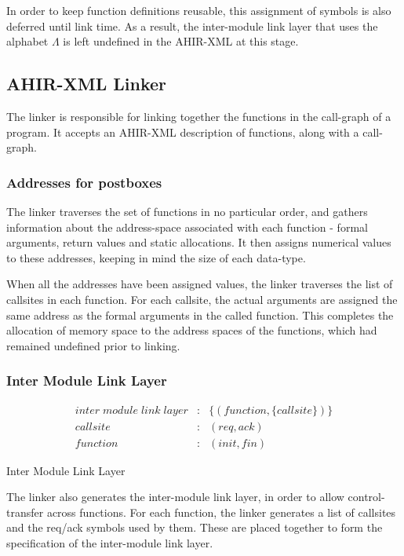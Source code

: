 \documentclass[12pt]{article}
\begin{document}
In order to keep function definitions reusable, this assignment of
symbols is also deferred until link time. As a result, the
inter-module link layer that uses the alphabet $\Lambda$ is left
undefined in the AHIR-XML at this stage.

\subsection{AHIR-XML Linker}

The linker is responsible for linking together the functions in the
call-graph of a program. It accepts an AHIR-XML description of
functions, along with a call-graph.

\subsubsection{Addresses for postboxes}

The linker traverses the set of functions in no particular order, and
gathers information about the address-space associated with each
function - formal arguments, return values and static allocations. It
then assigns numerical values to these addresses, keeping in mind the
size of each data-type.

When all the addresses have been assigned values, the linker traverses
the list of callsites in each function. For each callsite, the actual
arguments are assigned the same address as the formal arguments in the
called function. This completes the allocation of memory space to the
address spaces of the functions, which had remained undefined prior to
linking.

\subsubsection{Inter Module Link Layer}

\begin{table}[htb]
\small
\begin{eqnarray*}
inter\;module\;link\;layer & : & \{(function,\{callsite\})\}\\
callsite & : & (req,ack)\\
function & : & (init,fin)
\end{eqnarray*}
\caption{Inter Module Link Layer}
\label{table:inter-ll}
\end{table}

The linker also generates the inter-module link layer, in order to
allow control-transfer across functions. For each function, the linker
generates a list of callsites and the req/ack symbols used by them.
These are placed together to form the specification of the
inter-module link layer. 
\end{document}
